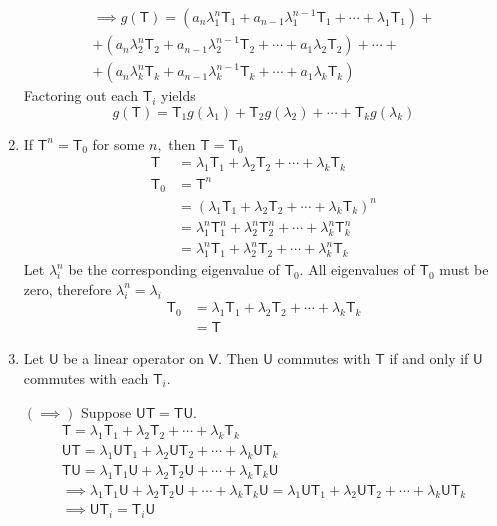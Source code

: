 \begin{enumerate}
\begin{multline}
\implies g(\mathsf{T}) = \left(a_n\lambda_1^n\mathsf{T}_1 +
  a_{n-1}\lambda_1^{n-1}\mathsf{T}_1 + \dotsb +
  \lambda_1\mathsf{T}_1\right) + \\+ \left(a_n\lambda_2^n\mathsf{T}_2 +
  a_{n-1}\lambda_2^{n-1}\mathsf{T}_2 + \dotsb +
  a_1\lambda_2\mathsf{T}_2\right) + \dotsb + \\
+\left(a_n\lambda_k^n\mathsf{T}_k +
  a_{n-1}\lambda_k^{n-1}\mathsf{T}_k + \dotsb +a_1\lambda_k\mathsf{T}_k\right)
\end{multline}
Factoring out each  $\mathsf{T}_i$ yields 
\begin{equation}
g(\mathsf{T}) = \mathsf{T}_1g(\lambda_1) + \mathsf{T}_2g(\lambda_2) +
\dotsb + \mathsf{T}_kg(\lambda_k)
\end{equation}
\item If $\mathsf{T}^n = \mathsf{T}_0$ for some $n,$ then $\mathsf{T}=\mathsf{T}_0$
\begin{align}
\mathsf{T} &= \lambda_1\mathsf{T}_1 + \lambda_2\mathsf{T}_2 + \dotsb +
\lambda_k\mathsf{T}_k\\
\mathsf{T}_0 &= \mathsf{T}^n\\
&= \left(\lambda_1\mathsf{T}_1 + \lambda_2\mathsf{T}_2 + \dotsb +
\lambda_k\mathsf{T}_k\right)^n\\
&= \lambda_1^n\mathsf{T}_1^n + \lambda_2^n\mathsf{T}_2^n + \dotsb +
\lambda_k^n\mathsf{T}_k^n\\
&= \lambda_1^n\mathsf{T}_1 + \lambda_2^n\mathsf{T}_2 + \dotsb + \lambda_k^n\mathsf{T}_k
\end{align}
Let $\lambda_i^n$ be the corresponding eigenvalue of $\mathsf{T}_0.$
All eigenvalues of $\mathsf{T}_0$ must be zero, therefore $\lambda_i^n
= \lambda_i$ 
\begin{align}
\mathsf{T}_0 &= \lambda_1\mathsf{T}_1 + \lambda_2\mathsf{T}_2 + \dotsb
+ \lambda_k\mathsf{T}_k\\
&= \mathsf{T}
\end{align}
\item Let $\mathsf{U}$ be a linear operator on $\mathsf{V}.$ Then
  $\mathsf{U}$ commutes with $\mathsf{T}$ if and only if $\mathsf{U}$
  commutes with each $\mathsf{T}_i.$  

$(\implies)$ Suppose $\mathsf{U}\mathsf{T} = \mathsf{T}\mathsf{U}$.
\begin{gather}
\mathsf{T} = \lambda_1\mathsf{T}_1 + \lambda_2\mathsf{T}_2 + \dotsb +
\lambda_k\mathsf{T}_k\\
\mathsf{U}\mathsf{T} = \lambda_1\mathsf{U}\mathsf{T}_1 +
\lambda_2\mathsf{U}\mathsf{T}_2 + \dotsb +
\lambda_k\mathsf{U}\mathsf{T}_k\\
\mathsf{T}\mathsf{U} = \lambda_1\mathsf{T}_1\mathsf{U} +
\lambda_2\mathsf{T}_2\mathsf{U}  + \dotsb +
\lambda_k\mathsf{T}_k\mathsf{U} \\
\implies  \lambda_1\mathsf{T}_1\mathsf{U} +
\lambda_2\mathsf{T}_2\mathsf{U}  + \dotsb +
\lambda_k\mathsf{T}_k\mathsf{U} = \lambda_1\mathsf{U}\mathsf{T}_1 +
\lambda_2\mathsf{U}\mathsf{T}_2 + \dotsb +
\lambda_k\mathsf{U}\mathsf{T}_k\\
\implies \mathsf{U}\mathsf{T}_i = \mathsf{T}_i\mathsf{U}
\end{gather}


\end{enumerate}
